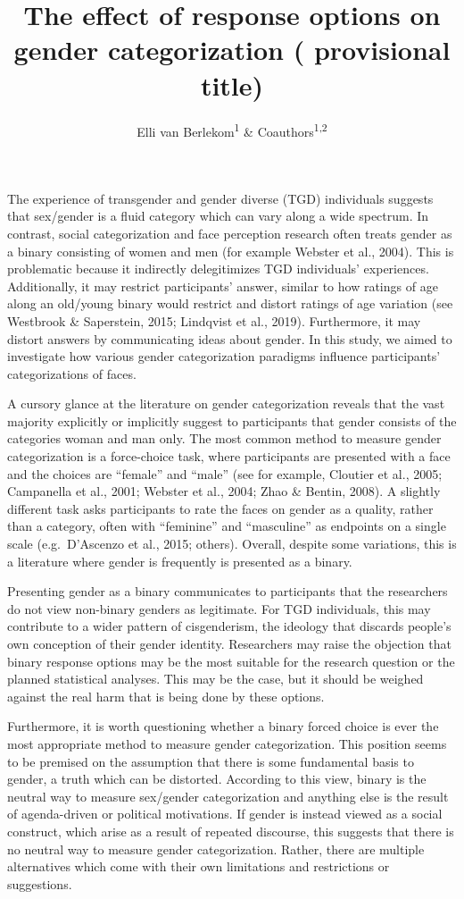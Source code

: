 \documentclass[
  man]{apa7}
\title{The effect of response options on gender categorization ( provisional title)}
\author{Elli van Berlekom\textsuperscript{1} \& Coauthors\textsuperscript{1,2}}
\date{}
\affiliation{\vspace{0.5cm}\textsuperscript{1} Stockholm University\\\textsuperscript{2} Lund University}
\begin{document}
\maketitle

The experience of transgender and gender diverse (TGD) individuals suggests that sex/gender is a fluid category which can vary along a wide spectrum. In contrast, social categorization and face perception research often treats gender as a binary consisting of women and men (for example Webster et al., 2004). This is problematic because it indirectly delegitimizes TGD individuals' experiences. Additionally, it may restrict participants' answer, similar to how ratings of age along an old/young binary would restrict and distort ratings of age variation (see Westbrook \& Saperstein, 2015; Lindqvist et al., 2019). Furthermore, it may distort answers by communicating ideas about gender. In this study, we aimed to investigate how various gender categorization paradigms influence participants' categorizations of faces.

A cursory glance at the literature on gender categorization reveals that the vast majority explicitly or implicitly suggest to participants that gender consists of the categories woman and man only. The most common method to measure gender categorization is a force-choice task, where participants are presented with a face and the choices are ``female'' and ``male'' (see for example, Cloutier et al., 2005; Campanella et al., 2001; Webster et al., 2004; Zhao \& Bentin, 2008). A slightly different task asks participants to rate the faces on gender as a quality, rather than a category, often with ``feminine'' and ``masculine'' as endpoints on a single scale (e.g.~D'Ascenzo et al., 2015; others). Overall, despite some variations, this is a literature where gender is frequently is presented as a binary.

Presenting gender as a binary communicates to participants that the researchers do not view non-binary genders as legitimate. For TGD individuals, this may contribute to a wider pattern of cisgenderism, the ideology that discards people's own conception of their gender identity. Researchers may raise the objection that binary response options may be the most suitable for the research question or the planned statistical analyses. This may be the case, but it should be weighed against the real harm that is being done by these options.

Furthermore, it is worth questioning whether a binary forced choice is ever the most appropriate method to measure gender categorization. This position seems to be premised on the assumption that there is some fundamental basis to gender, a truth which can be distorted. According to this view, binary is the neutral way to measure sex/gender categorization and anything else is the result of agenda-driven or political motivations. If gender is instead viewed as a social construct, which arise as a result of repeated discourse, this suggests that there is no neutral way to measure gender categorization. Rather, there are multiple alternatives which come with their own limitations and restrictions or suggestions.
\end{document}
